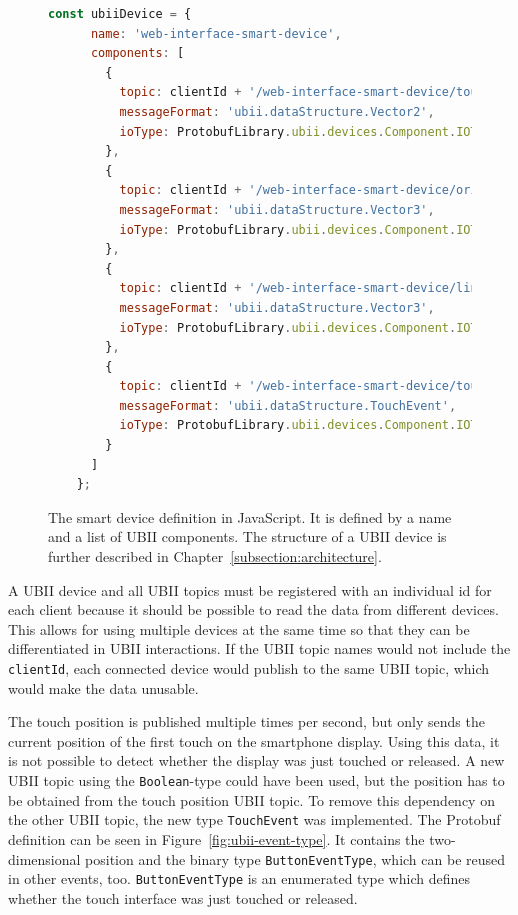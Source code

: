 \begin{figure}[H]
  \begin{lstlisting}[language=JavaScript]
    const ubiiDevice = {
      name: 'web-interface-smart-device',
      components: [
        {
          topic: clientId + '/web-interface-smart-device/touch_position',
          messageFormat: 'ubii.dataStructure.Vector2',
          ioType: ProtobufLibrary.ubii.devices.Component.IOType.INPUT
        },
        {
          topic: clientId + '/web-interface-smart-device/orientation',
          messageFormat: 'ubii.dataStructure.Vector3',
          ioType: ProtobufLibrary.ubii.devices.Component.IOType.INPUT
        },
        {
          topic: clientId + '/web-interface-smart-device/linear_acceleration',
          messageFormat: 'ubii.dataStructure.Vector3',
          ioType: ProtobufLibrary.ubii.devices.Component.IOType.INPUT
        },
        {
          topic: clientId + '/web-interface-smart-device/touch_events',
          messageFormat: 'ubii.dataStructure.TouchEvent',
          ioType: ProtobufLibrary.ubii.devices.Component.IOType.INPUT
        }
      ]
    };
  \end{lstlisting}
  \caption[Protobuf definition of the smart device]{The smart device definition in JavaScript. It is defined by a name and a list of \ac{UBII} components. The structure of a \ac{UBII} device is further described in Chapter~\ref{subsection:architecture}.}\label{fig:ubii-device-registration}
\end{figure}

A \ac{UBII} device and all \ac{UBII} topics must be registered with an individual id for each client because it should be possible to read the data from different devices. This allows for using multiple devices at the same time so that they can be differentiated in \ac{UBII} interactions. If the \ac{UBII} topic names would not include the \lstinline{clientId}, each connected device would publish to the same \ac{UBII} topic, which would make the data unusable.

The touch position is published multiple times per second, but only sends the current position of the first touch on the smartphone display. Using this data, it is not possible to detect whether the display was just touched or released. A new \ac{UBII} topic using the \lstinline{Boolean}-type could have been used, but the position has to be obtained from the touch position \ac{UBII} topic. To remove this dependency on the other \ac{UBII} topic, the new type \lstinline{TouchEvent} was implemented. The \ac{Protobuf} definition can be seen in Figure~\ref{fig:ubii-event-type}. It contains the two-dimensional position and the binary type \mbox{\lstinline{ButtonEventType},} which can be reused in other events, too. \lstinline{ButtonEventType} is an enumerated type which defines whether the touch interface was just touched or released.

